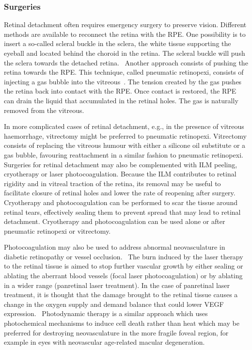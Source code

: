 \documentclass{article}
\begin{document}
\subsubsection*{Surgeries}

Retinal detachment often requires emergency surgery to preserve vision.
Different methods are available to reconnect the retina with the RPE.
One possibility is to insert a so-called scleral buckle in the sclera, the white tissue supporting the eyeball and located behind the choroid in the retina.
The scleral buckle will push the sclera towards the detached retina.~\cite{Sodhi_2008}
Another approach consists of pushing the retina towards the RPE.
This technique, called pneumatic retinopexi, consists of injecting a gas bubble into the vitreous~\cite{Sodhi_2008}.
The tension created by the gas pushes the retina back into contact with the RPE.
Once contact is restored, the RPE can drain the liquid that accumulated in the retinal holes.
The gas is naturally removed from the vitreous.

In more complicated cases of retinal detachment, e.g., in the presence of vitreous haemorrhage, vitrectomy might be preferred to pneumatic retinopexi.
Vitrectomy consists of replacing the vitreous humour with either a silicone oil substitute or a gas bubble, favouring reattachment in a similar fashion to pneumatic retinopexi.~\cite{Dervenis_2022}
Surgeries for retinal detachment may also be complemented with ILM peeling, cryotherapy or laser photocoagulation.
Because the ILM contributes to retinal rigidity and in vitreal traction of the retina, its removal may be useful to facilitate closure of retinal holes and lower the rate of reopening after surgery.~\cite{Chatziralli_2018}
Cryotherapy and photocoagulation can be performed to scar the tissue around retinal tears, effectively sealing them to prevent spread that may lead to retinal detachment.
Cryotherapy and photocoagulation can be used alone or after pneumatic retinopexi or vitrectomy.~\cite{Sodhi_2008}

Photocoagulation may also be used to address abnormal neovasculature in diabetic retinopathy or vessel occlusion.~\cite{Evans_2014}
The burn induced by the laser therapy to the retinal tissue is aimed to stop further vascular growth by either sealing or ablating the aberrant blood vessels (focal laser photocoagulation) or by ablating in a wider range (panretinal laser treatment).
In the case of panretinal laser treatment, it is thought that the damage brought to the retinal tissue causes a change in the oxygen supply and demand balance that could lower VEGF expression.~\cite{Evans_2014}
Photodynamic therapy is a similar approach which uses photochemical mechanisms to induce cell death rather than heat which may be preferred for destroying neovasculature in the more fragile foveal region, for example in eyes with neovascular age-related macular degeneration.~\cite{SchmidtErfurth_2000}
\end{document}
